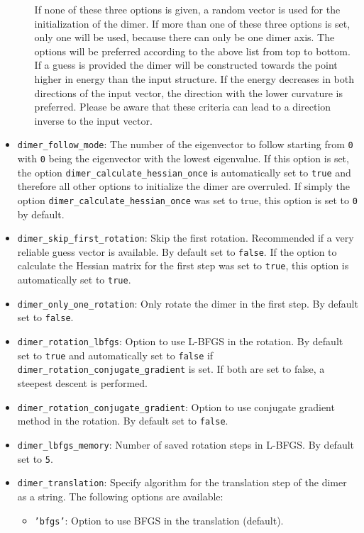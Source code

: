 \documentclass[]{tufte-book}
\begin{document}
\begin{itemize}
\begin{itemize}
If none of these three options is given, a random vector is used for the initialization of the dimer. If more than one of these three options is set, only one will be used, because there can only be one dimer axis. The options will be preferred according to the above list from top to bottom. If a guess is provided the dimer will be constructed towards the point higher in energy than the input structure. If the energy decreases in both directions of the input vector, the direction with the lower curvature is preferred. Please be aware that these criteria can lead to a direction inverse to the input vector.
\end{itemize}
\item \texttt{dimer\_follow\_mode}: The number of the eigenvector to follow starting from \texttt{0} with \texttt{0} being the eigenvector with the lowest eigenvalue. If this option is set, the option \texttt{dimer\_calculate\_hessian\_once} is automatically set to \texttt{true} and therefore all other options to initialize the dimer are overruled. If simply the option \texttt{dimer\_calculate\_hessian\_once} was set to true, this option is set to \texttt{0} by default.
\item \texttt{dimer\_skip\_first\_rotation}: Skip the first rotation. Recommended if a very reliable guess vector is available. By default set to \texttt{false}. If the option to calculate the Hessian matrix for the first step was set to \texttt{true}, this option is automatically set to \texttt{true}.
\item \texttt{dimer\_only\_one\_rotation}: Only rotate the dimer in the first step. By default set to \texttt{false}.
\item \texttt{dimer\_rotation\_lbfgs}: Option to use L-BFGS in the rotation. By default set to \texttt{true} and automatically set to \texttt{false} if \texttt{dimer\_rotation\_conjugate\_gradient} is set. If both are set to false, a steepest descent is performed.
\item \texttt{dimer\_rotation\_conjugate\_gradient}: Option to use conjugate gradient method in the rotation. By default set to \texttt{false}.
\item \texttt{dimer\_lbfgs\_memory}: Number of saved rotation steps in L-BFGS. By default set to \texttt{5}.
\item \texttt{dimer\_translation}: Specify algorithm for the translation step of the dimer as a string. The following options are available:
\begin{itemize}
\item \texttt{'bfgs'}: Option to use BFGS in the translation (default).

\end{itemize}
\end{itemize}
\end{document}

